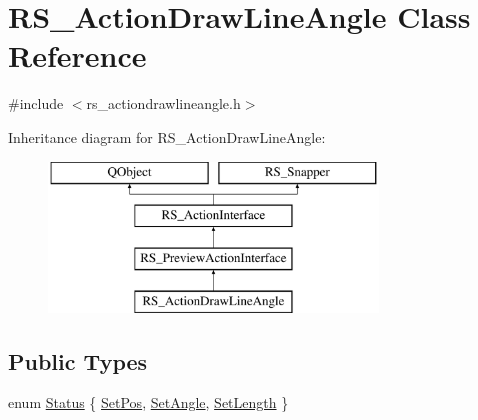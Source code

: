 \hypertarget{classRS__ActionDrawLineAngle}{\section{R\-S\-\_\-\-Action\-Draw\-Line\-Angle Class Reference}
\label{classRS__ActionDrawLineAngle}
}


{\ttfamily \#include $<$rs\-\_\-actiondrawlineangle.\-h$>$}

Inheritance diagram for R\-S\-\_\-\-Action\-Draw\-Line\-Angle\-:\begin{figure}[H]
\begin{center}
\leavevmode
\includegraphics[height=4.000000cm]{classRS__ActionDrawLineAngle}
\end{center}
\end{figure}
\subsection*{Public Types}
\begin{DoxyCompactItemize}
\item 
enum \hyperlink{classRS__ActionDrawLineAngle_a1824ce19ecc1ba7c0cb5e1dc78010f1c}{Status} \{ \hyperlink{classRS__ActionDrawLineAngle_a1824ce19ecc1ba7c0cb5e1dc78010f1ca11f9dd52f2c6b33a2bbc1f65e2ed85d4}{Set\-Pos}, 
\hyperlink{classRS__ActionDrawLineAngle_a1824ce19ecc1ba7c0cb5e1dc78010f1ca7b20cd1ea0ace7e450ac7170271fd843}{Set\-Angle}, 
\hyperlink{classRS__ActionDrawLineAngle_a1824ce19ecc1ba7c0cb5e1dc78010f1caaee69513cb55ff56861de44d32ffb5c4}{Set\-Length}
 \}
\end{DoxyCompactItemize}
